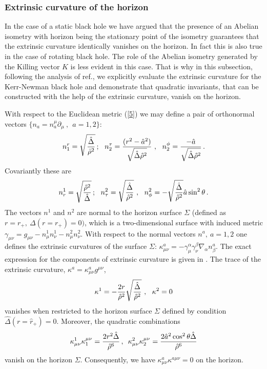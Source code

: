 \documentclass[12pt]{article}
\begin{document}
\subsubsection{Extrinsic curvature of the horizon}
In the case of a static black hole we have argued that the presence of an Abelian isometry with horizon being the stationary point of the isometry guarantees that the extrinsic curvature
identically vanishes on the horizon.  In fact this is also true in the case of rotating black hole. The role of the Abelian isometry generated by the Killing vector $K$ is less evident
in this case. That is why in this subsection, following the analysis of ref.\cite{Mann:1996bi}, we explicitly evaluate the extrinsic curvature for the Kerr-Newman black hole and demonstrate that quadratic invariants, that can be constructed with the help of the extrinsic curvature, vanish on the horizon. 

With respect to the  Euclidean metric (\ref{5}) we may define a pair of 
orthonormal vectors $\{n_a=n_a^\mu \partial_\mu~,~~a=1,2 \}$:
\begin{equation}
n_1^r=\sqrt{\hat{\Delta} \over \hat{\rho}^2}\, ;~~
n_2^\tau={(r^2-\hat{a}^2)\over \sqrt{\hat{\Delta} \hat{\rho}^2}}~,~~n_2^\phi={-
\hat{a}\over  \sqrt{\hat{\Delta} \hat{\rho}^2}}\, .
\label{normal vectors Kerr-Newman}
\end{equation}
Covariantly these are
\begin{equation}
 n^1_r=\sqrt{\hat{\rho}^2 \over \hat{\Delta}}\, ; ~~n^2_\tau= \sqrt{\hat{\Delta} \over \hat{\rho}^2}~,~~n^2_\phi=-\sqrt{\hat{\Delta} \over \hat{\rho}^2} \hat{a}\sin^2\theta\, .
\label{normal co-vectors Kerr-Newman}
\end{equation} 
The vectors $n^1$ and $n^2$ are normal to the horizon surface $\Sigma$ 
(defined as $r=r_+,~\Delta (r=r_+)=0)$, which is a
two-dimensional surface with induced metric $\gamma_{\mu\nu}=g_{\mu\nu}-
n^1_\mu n^1_\nu -n^2_\mu n^2_\nu$. 
With respect to the normal vectors $n^a, ~a=1,2$ 
one defines  the extrinsic 
curvatures of the surface $\Sigma$: 
$\kappa^a_{\mu\nu}=-\gamma_\mu^\alpha \gamma_\nu^\beta \nabla_\alpha n^a_\beta$.
The exact expression for the components of extrinsic curvature is given in \cite{Mann:1996bi}.
The trace of the extrinsic curvature, $\kappa^a=\kappa^a_{\mu\nu}g^{\mu\nu}$,
\begin{equation}
\kappa^1=-{2r\over \hat{\rho}^2}\sqrt{\hat{\Delta}\over \hat{\rho}^2}~,~~\kappa^2=0
\label{extrinsic-KN}
\end{equation}
vanishes when restricted to the horizon surface 
$\Sigma$ defined by condition $\hat{\Delta}(r=\hat{r}_+)=0$. 
Moreover, the quadratic combinations 
\begin{eqnarray}
\kappa^1_{\mu\nu} \kappa_{1}^{\mu\nu}= {2r^2\hat{\Delta}\over \hat{\rho}^6}\, , \,\,\, \kappa^2_{\mu\nu} \kappa_{2}^{\mu\nu}= {2\hat{a}^2\cos^2\theta \hat{\Delta}
 \over \hat{\rho}^6} 
\label{trace extrinsic-KN }
\end{eqnarray}
vanish on the horizon $\Sigma$. Consequently, we have
$\kappa^a_{\mu\nu} \kappa^{a\mu\nu}=0$ on the horizon.
\end{document}
